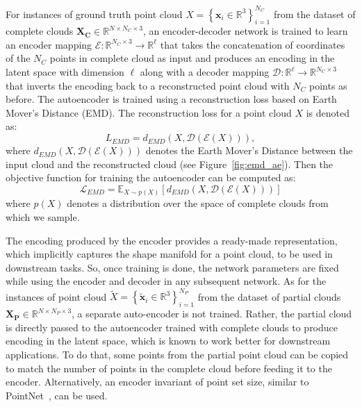         For instances of ground truth point cloud $X=\left\{\mathbf{x}_{i} \in \mathbb{R}^{3}\right\}_{i=1}^{N_C}$ from the dataset of complete clouds $\mathbf{X_C} \in \mathbb{R}^{N \times N_C \times 3}$, an encoder-decoder network is trained to learn an encoder mapping $\mathcal{E}: \mathbb{R}^{N_C \times 3} \rightarrow \mathbb{R}^{\ell}$ that takes the concatenation of coordinates of the $N_C$ points in complete cloud as input and produces an encoding in the latent space with dimension $\ell$ along with a decoder mapping $\mathcal{D}: \mathbb{R}^{\ell} \rightarrow \mathbb{R}^{N_C \times 3}$ that inverts the encoding back to a reconstructed point cloud with $N_C$ points as before. The autoencoder is trained using a reconstruction loss based on Earth Mover's Distance (EMD). The reconstruction loss for a point cloud $X$ is denoted as:
        \begin{equation}\label{emd_loss}
            L_{EMD} = d_{EMD}\left(X, \mathcal{D}(\mathcal{E}(X))\right),
        \end{equation}
        where $d_{EMD}\left(X, \mathcal{D}(\mathcal{E}(X))\right)$ denotes the Earth Mover's Distance between the input cloud and the reconstructed cloud (see Figure~\ref{fig:emd_ae}). Then the objective function for training the autoencoder can be computed as:
        \begin{equation}\label{emd_obj}
            \mathcal{L}_{EMD} = \mathbb{E}_{X \sim p(X)} \left[d_{EMD}\left(X, \mathcal{D}(\mathcal{E}(X))\right)\right]
        \end{equation}
        where $p(X)$ denotes a distribution over the space of complete clouds from which we sample.
        \newline
        
        The encoding produced by the encoder provides a ready-made representation, which implicitly captures the shape manifold for a point cloud, to be used in downstream tasks. So, once training is done, the network parameters are fixed while using the encoder and decoder in any subsequent network. As for the instances of point cloud $\tilde{X}=\left\{\mathbf{\tilde{x}}_{i} \in \mathbb{R}^{3}\right\}_{i=1}^{N_P}$ from the dataset of partial clouds $\mathbf{X_P} \in \mathbb{R}^{N \times N_P \times 3}$, a separate auto-encoder is not trained. Rather, the partial cloud is directly passed to the autoencoder trained with complete clouds to produce encoding in the latent space, which is known to work better for downstream applications. To do that, some points from the partial point cloud can be copied to match the number of points in the complete cloud before feeding it to the encoder. Alternatively, an encoder invariant of point set size, similar to PointNet~\cite{PointNet}, can be used.


